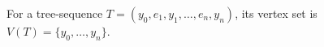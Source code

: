 \begin{definition}
For a tree-sequence
$T=(y_0,e_1,y_1,\ldots,e_n,y_n)$, its vertex set is
$V(T)=\{y_0,\ldots,y_n\}$.
\end{definition}

